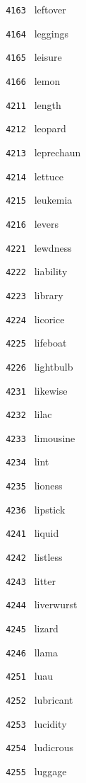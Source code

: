 \documentclass[11pt]{article}
\begin{document}
\begin{multicols}{6}
\noindent \texttt{ 4163 } leftover  \par
\noindent \texttt{ 4164 } leggings  \par
\noindent \texttt{ 4165 } leisure  \par
\noindent \texttt{ 4166 } lemon  \par
\noindent \texttt{ 4211 } length  \par
\noindent \texttt{ 4212 } leopard  \par
\noindent \texttt{ 4213 } leprechaun  \par
\noindent \texttt{ 4214 } lettuce  \par
\noindent \texttt{ 4215 } leukemia  \par
\noindent \texttt{ 4216 } levers  \par
\noindent \texttt{ 4221 } lewdness  \par
\noindent \texttt{ 4222 } liability  \par
\noindent \texttt{ 4223 } library  \par
\noindent \texttt{ 4224 } licorice  \par
\noindent \texttt{ 4225 } lifeboat  \par
\noindent \texttt{ 4226 } lightbulb  \par
\noindent \texttt{ 4231 } likewise  \par
\noindent \texttt{ 4232 } lilac  \par
\noindent \texttt{ 4233 } limousine  \par
\noindent \texttt{ 4234 } lint  \par
\noindent \texttt{ 4235 } lioness  \par
\noindent \texttt{ 4236 } lipstick  \par
\noindent \texttt{ 4241 } liquid  \par
\noindent \texttt{ 4242 } listless  \par
\noindent \texttt{ 4243 } litter  \par
\noindent \texttt{ 4244 } liverwurst  \par
\noindent \texttt{ 4245 } lizard  \par
\noindent \texttt{ 4246 } llama  \par
\noindent \texttt{ 4251 } luau  \par
\noindent \texttt{ 4252 } lubricant  \par
\noindent \texttt{ 4253 } lucidity  \par
\noindent \texttt{ 4254 } ludicrous  \par
\noindent \texttt{ 4255 } luggage  \par

\end{multicols}
\end{document}
